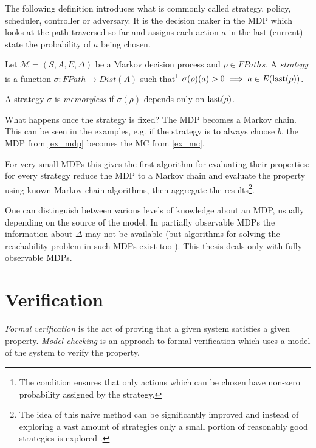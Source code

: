 The following definition introduces what is commonly called strategy,
policy, scheduler, controller or adversary. It is the decision maker in
the MDP which looks at the path traversed so far and assigns each action
$a$ in the last (current) state the probability of $a$ being chosen.

\begin{definition}[Strategy]
    Let $\mathcal{M} = (S,A,E,\Delta)$ be a Markov decision process
    and $\rho \in FPaths$.
    A {\em strategy} is a function
    $\sigma : FPath \to Dist(A)$
    such that\footnote{
The condition ensures that only actions which can
be chosen have non-zero probability assigned by the strategy.
    }
    $\sigma(\rho)(a) > 0 \implies a \in E(\operatorname{last}(\rho))$.

    A strategy $\sigma$ is {\em memoryless} if $\sigma(\rho)$ depends
    only on $\operatorname{last}(\rho)$.
\end{definition}

What happens once the strategy is fixed? The MDP becomes a Markov chain.
This can be seen in the examples, e.g. if the strategy is to always
choose $b$, the MDP from \autoref{ex_mdp} becomes the MC from
\autoref{ex_mc}.

For very small MDPs this gives the first algorithm for evaluating their
properties: for every strategy reduce the MDP to a Markov chain and evaluate the
property using known Markov chain algorithms, then aggregate the
results\footnote{The idea of this naive method can be significantly improved and instead
of exploring a vast amount of strategies only a small portion of
reasonably good strategies is explored \parencite{smc}.}.



One can distinguish between various levels of knowledge about an MDP,
usually depending on the source of the model.
In partially observable MDPs the information about $\Delta$ may not be
available (but algorithms for solving the reachability
problem in such MDPs exist too \parencite{atva14}). This thesis deals
only with fully observable MDPs.


\section{Verification}

{\em Formal verification} is the act of proving that a given system satisfies
a given property. {\em Model
checking} is an approach to formal verification which uses a model of
the system to verify the property.


